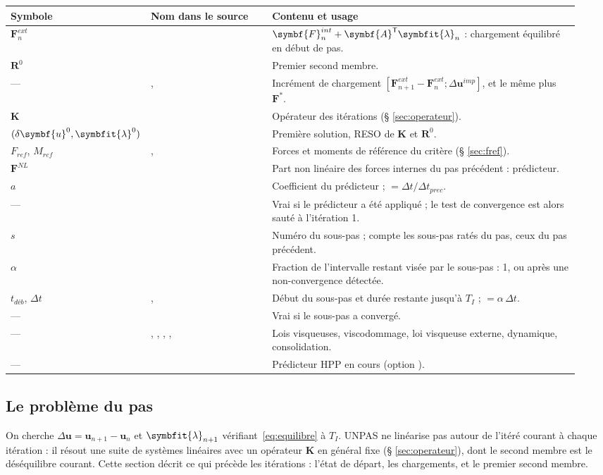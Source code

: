 \documentclass[11pt,a4paper]{article}
\makeatletter
\numberwithin{equation}{section}
\newcommand{\src}[1]{\texttt{\detokenize{#1}}}          %
\newcommand{\pr}[1]{\textsf{#1}}                        %
\newcommand{\op}[1]{\textsf{\small #1}}                 %
\newcommand{\vc}[1]{\symbf{#1}}                         %
\newcommand{\vg}[1]{\symbfit{#1}}                       %
\newenvironment{glossaire}[1][Glossaire]{%
  \par\smallskip\needspace{7\baselineskip}\noindent{\sffamily\bfseries\small #1}\par\nopagebreak
  \small
  \renewcommand{\arraystretch}{1.18}
  \begin{longtable}{@{}>{\raggedright\arraybackslash}p{0.17\linewidth}
                     >{\raggedright\arraybackslash}p{0.22\linewidth}
                     >{\raggedright\arraybackslash}p{0.555\linewidth}@{}}
  \toprule
  \textbf{Symbole} & \textbf{Nom dans le source} & \textbf{Contenu et usage}\\
  \midrule\endhead
  \bottomrule\endfoot}
  {\end{longtable}\addtocounter{table}{-1}\normalsize\vspace{-0.4em}}
\makeatother
\begin{document}
\begin{glossaire}
$\vc F^{ext}_n$ & \src{FEXT0} & $\vc F^{int}_n + \vc A^{\mathsf T}\vg\lambda_n$ : chargement équilibré en début de pas.\\
$\vc R^{0}$ & \src{RESIDU} & Premier second membre.\\
— & \src{ZDFORC}, \src{ZDFINI} & Incrément de chargement $[\vc F^{ext}_{n+1} - \vc F^{ext}_n ; \Delta\vc u^{imp}]$, et le même plus $\vc F^{*}$.\\
$\vc K$ & \src{ZRAID} & Opérateur des itérations (§ \ref{sec:operateur}).\\
$(\delta\vc u^{0}, \vg\lambda^{0})$ & \src{ZDEP1} & Première solution, \op{RESO} de $\vc K$ et $\vc R^{0}$.\\
$F_{ref}$, $M_{ref}$ & \src{XDENO}, \src{XDENOM} & Forces et moments de référence du critère (§ \ref{sec:fref}).\\
$\vc F^{NL}$ & \src{ZFNONL} & Part non linéaire des forces internes du pas précédent : prédicteur.\\
$a$ & \src{AMPL} & Coefficient du prédicteur ; \src{AMPLT} $= \Delta t/\Delta t_{prec}$.\\
— & \src{INIT1} & Vrai si le prédicteur a été appliqué ; le test de convergence est alors sauté à l'itération 1.\\
$s$ & \src{knoconv} & Numéro du sous-pas ; \src{WTAB.'ISOUSPAS'} compte les sous-pas ratés du pas, \src{ISOUSPPP} ceux du pas précédent.\\
$\alpha$ & \src{COEPI} & Fraction de l'intervalle restant visée par le sous-pas : 1, ou \src{RELAXATION_NONCONV} après une non-convergence détectée.\\
$t_{déb}$, $\Delta t$ & \src{TDEBUT}, \src{PASDT} & Début du sous-pas et durée restante jusqu'à $T_I$ ; \src{ZDT} $= \alpha\,\Delta t$.\\
— & \src{ZICONV} & Vrai si le sous-pas a convergé.\\
— & \src{IVISCO}, \src{IVIDOM}, \src{IVIEXT}, \src{IDYN}, \src{ISOL} & Lois visqueuses, viscodommage, loi visqueuse externe, dynamique, consolidation.\\
— & \src{HPP_EPS} & Prédicteur HPP en cours (option \src{PREDICTEUR 'HPP'}).\\
\end{glossaire}

\subsection{Le problème du pas}

On cherche $\Delta\vc u = \vc u_{n+1} - \vc u_n$ et $\vg\lambda_{n+1}$ vérifiant~\eqref{eq:equilibre} à $T_I$.
\pr{UNPAS} ne linéarise pas autour de l'itéré courant à chaque itération : il résout une suite de systèmes linéaires avec un opérateur $\vc K$ en général fixe (§ \ref{sec:operateur}), dont le second membre est le déséquilibre courant.
Cette section décrit ce qui précède les itérations : l'état de départ, les chargements, et le premier second membre.
\end{document}

